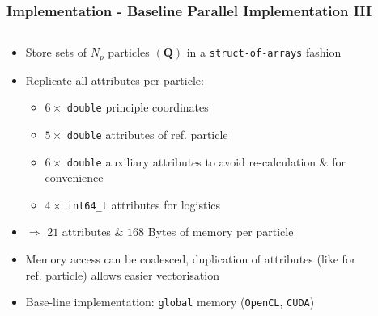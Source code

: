 \documentclass{beamer}
\begin{document}
\begin{frame}[t]
    \frametitle{Implementation - Baseline Parallel Implementation III}
    \begin{columns}
        \begin{column}{0.6\textwidth}
        \begin{itemize}
            \item Store {\color{MyDarkMagenta} sets of $N_p$ particles} $\left( \mathbf{Q} \right)$ in a \texttt{struct-of-arrays} fashion
            \item Replicate all attributes per particle:
            \begin{itemize}
                \item $6 \times$ \texttt{double} principle coordinates
                \item $5 \times$ \texttt{double} attributes of ref. particle
                \item $6 \times$ \texttt{double} auxiliary attributes to avoid re-calculation \& for convenience
                \item $4 \times$ \texttt{int64\_t} attributes for logistics
            \end{itemize}
            \item $\Rightarrow$ $21$ attributes \& $168$ Bytes of memory per particle
            \item Memory access can be coalesced, duplication of attributes (like for ref. particle) allows easier vectorisation
            \item {\color{MyDarkMagenta}Base-line implementation}: \texttt{global} memory (\texttt{OpenCL}, \texttt{CUDA})
        \end{itemize}
        \end{column}
        \begin{column}{0.4\textwidth}
            \begin{figure}[H]
                \centering

\end{figure}
\end{column}
\end{columns}
\end{frame}
\end{document}
